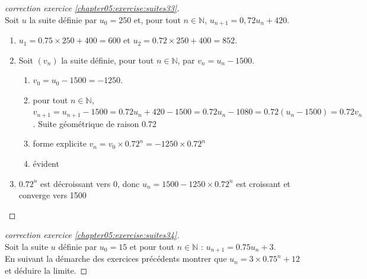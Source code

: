 \documentclass[main.tex]{subfiles}
\begin{document}
\begin{proof}[correction exercice \ref{chapter05:exercise:suites33}] \hfill \\
	Soit $u$ la suite définie par $u_0=250$ et, pour tout $n \in \mathbb{N}$, $u_{n+1} = 0,72u_{n} +420$.
	\begin{enumerate}[label=\arabic*),leftmargin=*] 
		\item \colorbox{BurntOrange}{$u_1=0.75\times 250+400=600$ et $u_2=0.72\times 250+400=852$}.
		\item Soit $(v_n)$ la suite définie, pour tout $n \in \mathbb{N}$, par $v_n = u_n -1500$.
		\begin{enumerate}[label=\alph*),leftmargin=*] 
			\item \colorbox{BurntOrange}{ $v_0=u_0-1500=-1250$}.
			\item \colorbox{BurntOrange}{pour tout $n \in \mathbb{N}$, $v_{n+1}=u_{n+1}-1500=0.72u_n+420-1500=0.72u_n-1080=0.72(u_n-1500)=0.72v_n$. Suite géométrique de raison 0.72}
			\item \colorbox{BurntOrange}{forme explicite $v_n=v_0\times 0.72^n=-1250\times 0.72^n$}
			\item \colorbox{BurntOrange}{évident}
		\end{enumerate}
		\item \colorbox{BurntOrange}{$0.72^n$ est décroissant vers $0$, donc $u_n=1500-1250\times 0.72^n$ est croissant et converge vers 1500}
	\end{enumerate}
\end{proof}  
\begin{proof}[correction exercice \ref{chapter05:exercise:suites34}] \hfill \\
Soit la suite $u$ définie par $u_0=15$ et pour tout $n\in\mathbb{N}$ : $u_{n+1}=0.75 u_n + 3$. \\
En suivant la démarche des exercices précédents montrer que $u_n=3\times 0.75^n+12$ et déduire la limite. 
\end{proof}
\end{document}
